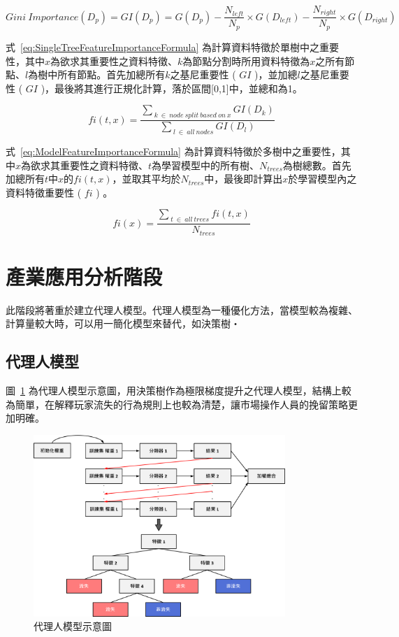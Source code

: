 \begin{equation}
  \label{eq:GiniImportanceFormula}
  Gini\ Importance(D_p) = GI(D_p) = G(D_p) - \frac{N_{left}}{N_p} \times G(D_{left}) - \frac{N_{right}}{N_p} \times G(D_{right})
\end{equation}

式~\ref{eq:SingleTreeFeatureImportanceFormula} 為計算資料特徵於單樹中之重要性，其中$x$為欲求其重要性之資料特徵、$k$為節點分割時所用資料特徵為$x$之所有節點、$l$為樹中所有節點。首先加總所有$k$之基尼重要性 ( $GI$ )，並加總$l$之基尼重要性 ( $GI$ )，最後將其進行正規化計算，落於區間[0,1]中，並總和為1。

\begin{equation}
  \label{eq:SingleTreeFeatureImportanceFormula}
  fi(t,x) = \frac{\sum_{\ k\ \in\ node\ split\ based\ on\ x}GI(D_k)}{\sum_{\ l\ \in\ all\ nodes}GI(D_l)}
\end{equation}

式~\ref{eq:ModelFeatureImportanceFormula} 為計算資料特徵於多樹中之重要性，其中$x$為欲求其重要性之資料特徵、$t$為學習模型中的所有樹、$N_{trees}$為樹總數。首先加總所有$t$中$x$的$fi(t,x)$，並取其平均於$N_{trees}$中，最後即計算出$x$於學習模型內之資料特徵重要性 ( $fi$ ) 。

\begin{equation}
  \label{eq:ModelFeatureImportanceFormula}
  fi(x) = \frac{\sum_{\ t\ \in\ all\ trees}fi(t,x)}{N_{trees}}
\end{equation}

\section{產業應用分析階段}
\label{sec:ApplicationAnalysis}

此階段將著重於建立代理人模型。代理人模型為一種優化方法，當模型較為複雜、計算量較大時，可以用一簡化模型來替代，如決策樹‧

\subsection{代理人模型}
\label{subsec:SurrogateModel}

圖~\ref{fig:Image_SurrogateModel} 為代理人模型示意圖，用決策樹作為極限梯度提升之代理人模型，結構上較為簡單，在解釋玩家流失的行為規則上也較為清楚，讓市場操作人員的挽留策略更加明確。

\begin{figure}[!htb]
  \begin{center}
    \includegraphics[width=0.85\textwidth]{figures/Image_SurrogateModel.png}
    \caption[代理人模型示意圖]{代理人模型示意圖}
    \label{fig:Image_SurrogateModel}
  \end{center}
\end{figure}
\newpage
